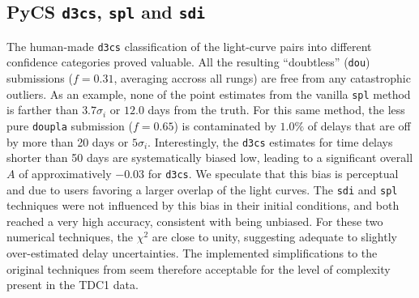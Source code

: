 \documentclass[traditabstract]{aa}
\begin{document}
\subsection{PyCS {\tt d3cs}, {\tt spl} and {\tt sdi}}

The human-made {\tt d3cs} classification of the light-curve pairs into different confidence categories proved valuable. All the resulting ``doubtless'' ({\tt dou}) submissions ($f=0.31$, averaging accross all rungs) are free from any catastrophic outliers. As an example, none of the point estimates from the vanilla {\tt spl} method is farther than $3.7 \sigma_i$ or $12.0$ days from the truth. For this same method, the less pure {\tt doupla} submission ($f=0.65$) is contaminated by $1.0\%$ of delays that are off by more than 20 days or $5 \sigma_i$. Interestingly, the {\tt d3cs} estimates for time delays shorter than 50 days are systematically biased low, leading to a significant overall $A$ of approximatively $-0.03$ for {\tt d3cs}. We speculate that this bias is perceptual and due to users favoring a larger overlap of the light curves. The {\tt sdi} and {\tt spl} techniques were not influenced by this bias in their initial conditions, and both reached a very high accuracy, consistent with being unbiased. For these two numerical techniques, the $\chi^2$ are close to unity, suggesting adequate to slightly over-estimated delay uncertainties. The implemented simplifications to the original techniques from \citet{pycs} seem therefore  acceptable for the level of complexity present in the TDC1 data.




















\end{document}
